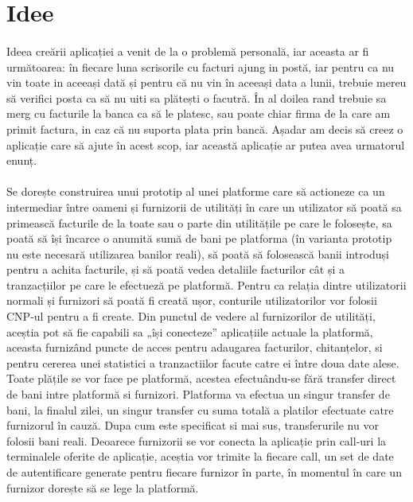 \documentclass[12pt]{report}
\begin{document}
	\section{Idee}
	\paragraph{}Ideea creării aplicației a venit de la o problemă personală, iar aceasta ar fi următoarea: în fiecare luna scrisorile cu facturi ajung in postă, iar pentru ca nu vin toate in aceeași dată și pentru că nu vin în aceeași data a lunii, trebuie mereu să verifici posta ca să nu uiti sa plătești o facutră. În al doilea rand trebuie sa merg cu facturile la banca ca să le platesc, sau poate chiar firma de la care am primit factura, in caz că nu suporta plata prin bancă. Așadar am decis să creez o aplicație care să ajute în acest scop, iar această aplicație ar putea avea urmatorul enunț.
	\paragraph{}Se dorește construirea unui prototip al unei platforme care să actioneze ca un intermediar între oameni și furnizorii de utilități în care un utilizator să poată sa primească facturile de la toate sau o parte din utilitățile pe care le folosește, sa poată să își încarce o anumită sumă de bani pe platforma (în varianta prototip nu este necesară utilizarea banilor reali), să poată să folosească banii introduși pentru a achita facturile, și să poată vedea detaliile facturilor cât și a tranzacțiilor pe care le efectueză pe platformă. Pentru ca relația dintre utilizatorii normali și furnizori să poată fi creată ușor, conturile utilizatorilor vor folosii CNP-ul pentru a fi create. Din punctul de vedere al furnizorilor de utilități, aceștia pot să fie capabili sa „își conecteze” aplicațiile actuale la platformă, aceasta furnizând puncte de acces pentru adaugarea facturilor, chitanțelor, si pentru cererea unei statistici a tranzactiilor facute catre ei între doua date alese. Toate plățile se vor face pe platformă, acestea efectuându-se fără transfer direct de bani intre platformă si furnizori. Platforma va efectua un singur transfer de bani, la finalul zilei, un singur transfer cu suma totală a platilor efectuate catre furnizorul în cauză. Dupa cum este specificat si mai sus, transferurile nu vor folosii bani reali. Deoarece furnizorii se vor conecta la aplicație prin call-uri la terminalele oferite de aplicație, aceștia vor trimite la fiecare call, un set de date de autentificare generate pentru fiecare furnizor în parte, în momentul în care un furnizor dorește să se lege la platformă. 
\end{document}
